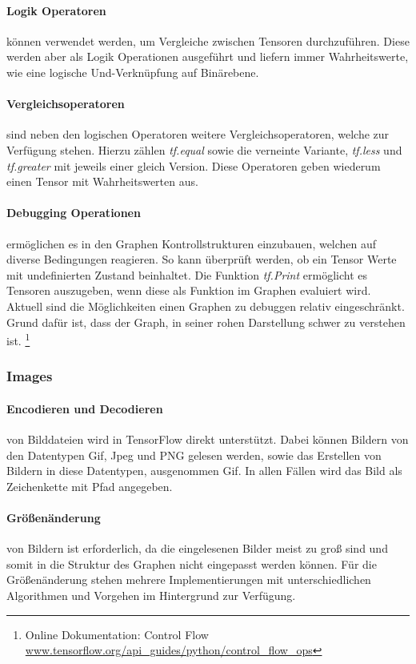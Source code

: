 \paragraph{Logik Operatoren} können verwendet werden, um Vergleiche zwischen Tensoren durchzuführen. 
Diese werden aber als Logik Operationen ausgeführt und liefern immer Wahrheitswerte, wie eine logische Und-Verknüpfung auf Binärebene.

\paragraph{Vergleichsoperatoren} sind neben den logischen Operatoren weitere Vergleichsoperatoren, welche zur Verfügung stehen. 
Hierzu zählen \textit{tf.equal} sowie die verneinte Variante, \textit{tf.less} und \textit{tf.greater} mit jeweils einer gleich Version. 
Diese Operatoren geben wiederum einen Tensor mit Wahrheitswerten aus.

\paragraph{Debugging Operationen} ermöglichen es in den Graphen Kontrollstrukturen einzubauen, welchen auf diverse Bedingungen reagieren.
So kann überprüft werden, ob ein Tensor Werte mit undefinierten Zustand beinhaltet. 
Die Funktion \textit{tf.Print} ermöglicht es Tensoren auszugeben, wenn diese als Funktion im Graphen evaluiert wird. 
Aktuell sind die Möglichkeiten einen Graphen zu debuggen relativ eingeschränkt. 
Grund dafür ist, dass der Graph, in seiner rohen Darstellung schwer zu verstehen ist. \footnote{Online Dokumentation: Control Flow \url{www.tensorflow.org/api_guides/python/control_flow_ops}}

\subsubsection{Images}

\paragraph{Encodieren und Decodieren} von Bilddateien wird in TensorFlow direkt unterstützt.
Dabei können Bildern von den Datentypen Gif, Jpeg und PNG gelesen werden, sowie das Erstellen von Bildern in diese Datentypen, ausgenommen Gif.
In allen Fällen wird das Bild als Zeichenkette mit Pfad angegeben. 

\paragraph{Größenänderung} von Bildern ist erforderlich, da die eingelesenen Bilder meist zu groß sind und somit in die Struktur des Graphen nicht eingepasst werden können. 
Für die Größenänderung stehen mehrere Implementierungen mit unterschiedlichen Algorithmen und Vorgehen im Hintergrund zur Verfügung.

